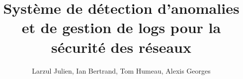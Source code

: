 \documentclass[12pt,times,rapport,french,apa]{uqac}
\begin{document}
\pagestyle{empty}
\thispagestyle{empty}


\title{Système de détection d'anomalies et de gestion de logs pour la sécurité des réseaux}
\author{Larzul Julien, Ian Bertrand, Tom Humeau, Alexis Georges}



\maketitle

\opening

% 

%

\tableofcontents
\cleardoublepage
\listoffigures

% 
% 
% 

\maincontent











% 


%
\end{document}
